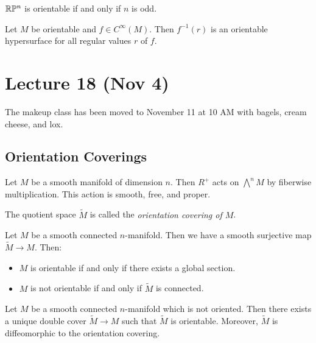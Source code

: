 \documentclass[twoside, 10pt]{article}
\begin{document}
    \begin{exer}[Homework]
        $\mathbb{R}\mathbb{P}^n$ is orientable if and only if $n$ is odd.
    \end{exer}

    \begin{exm}
        Let $M$ be orientable and $f \in C^{\infty}(M)$. Then $f^{-1}(r)$ is an orientable hypersurface for all regular values $r$ of $f$.
    \end{exm}

    \section{Lecture 18 (Nov 4)}%
    \label{sec:lecture_18_nov_4_}
    
    The makeup class has been moved to November 11 at 10 AM with bagels, cream cheese, and lox.

    \subsection{Orientation Coverings}%
    \label{sub:orientation_coverings}
    
    \begin{lem}
        Let $M$ be a smooth manifold of dimension $n$. Then $R^{+}$ acts on $\bigwedge^n M$ by fiberwise multiplication. This action is smooth, free, and proper.
    \end{lem}

    \begin{defn}
        The quotient space $\widetilde{M}$ is called the \textit{orientation covering of $M$}.
    \end{defn}

    \begin{thm}
        Let $M$ be a smooth connected $n$-manifold. Then we have a smooth surjective map $\widetilde{M} \to M$. Then:
        \begin{itemize}
            \item $M$ is orientable if and only if there exists a global section.
            \item $M$ is not orientable if and only if $\widetilde{M}$ is connected.
        \end{itemize}
    \end{thm}

    \begin{thm}
        Let $M$ be a smooth connected $n$-manifold which is not oriented. Then there exists a unique double cover $\widetilde{M} \to M$ such that $\widetilde{M}$ is orientable. Moreover, $\widetilde{M}$ is diffeomorphic to the orientation covering.
    \end{thm}
\end{document}
